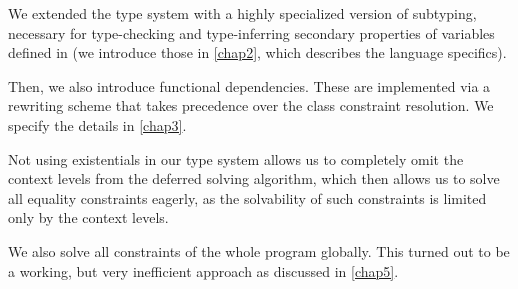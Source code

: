 We extended the type system with a highly specialized version of subtyping, necessary for type-checking and type-inferring secondary properties of variables defined in \cmm (we introduce those in \cref{chap2}, which describes the language specifics).

Then, we also introduce functional dependencies. These are implemented via a rewriting scheme that takes precedence over the class constraint resolution. We specify the details in \cref{chap3}.

Not using existentials in our type system allows us to completely omit the context levels from the deferred solving algorithm, which then allows us to solve all equality constraints eagerly, as the solvability of such constraints is limited only by the context levels.

We also solve all constraints of the whole program globally. This turned out to be a working, but very inefficient approach as discussed in \cref{chap5}.

